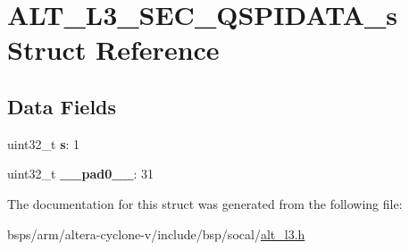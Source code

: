 \hypertarget{structALT__L3__SEC__QSPIDATA__s}{}\section{A\+L\+T\+\_\+\+L3\+\_\+\+S\+E\+C\+\_\+\+Q\+S\+P\+I\+D\+A\+T\+A\+\_\+s Struct Reference}
\label{structALT__L3__SEC__QSPIDATA__s}
\subsection*{Data Fields}
\begin{DoxyCompactItemize}
\item 
\mbox{\label{structALT__L3__SEC__QSPIDATA__s_a7771626e91287a1d0acd53bf3fbd1b6d}} 
uint32\+\_\+t {\bfseries s}\+: 1
\item 
\mbox{\label{structALT__L3__SEC__QSPIDATA__s_a3f8cbcd9f2b0a2853034afefe776b43d}} 
uint32\+\_\+t {\bfseries \+\_\+\+\_\+pad0\+\_\+\+\_\+}\+: 31
\end{DoxyCompactItemize}


The documentation for this struct was generated from the following file\+:\begin{DoxyCompactItemize}
\item 
bsps/arm/altera-\/cyclone-\/v/include/bsp/socal/\mbox{\hyperlink{alt__l3_8h}{alt\+\_\+l3.\+h}}\end{DoxyCompactItemize}
